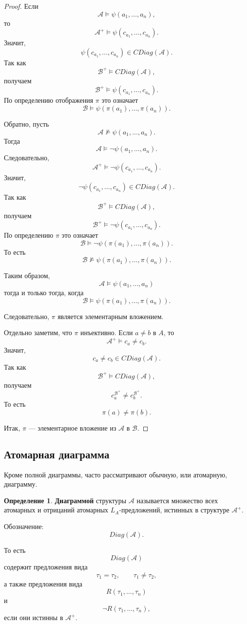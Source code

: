 \documentclass[12pt,a4paper,oneside,openany]{book}
\theoremstyle{definition}
\newtheorem{definition}{Определение}[chapter]
\theoremstyle{plain}
\theoremstyle{remark}
\begin{document}
\begin{proof}
Если
\[
\mathcal A\models\psi(a_1,\ldots,a_n),
\]
то
\[
\mathcal A^+\models\psi(c_{a_1},\ldots,c_{a_n}).
\]
Значит,
\[
\psi(c_{a_1},\ldots,c_{a_n})\in CDiag(\mathcal A).
\]
Так как
\[
\mathcal B^+\models CDiag(\mathcal A),
\]
получаем
\[
\mathcal B^+\models\psi(c_{a_1},\ldots,c_{a_n}).
\]
По определению отображения $\pi$ это означает
\[
\mathcal B\models\psi(\pi(a_1),\ldots,\pi(a_n)).
\]

Обратно, пусть
\[
\mathcal A\not\models\psi(a_1,\ldots,a_n).
\]
Тогда
\[
\mathcal A\models\neg\psi(a_1,\ldots,a_n).
\]
Следовательно,
\[
\mathcal A^+\models\neg\psi(c_{a_1},\ldots,c_{a_n}).
\]
Значит,
\[
\neg\psi(c_{a_1},\ldots,c_{a_n})\in CDiag(\mathcal A).
\]
Так как
\[
\mathcal B^+\models CDiag(\mathcal A),
\]
получаем
\[
\mathcal B^+\models\neg\psi(c_{a_1},\ldots,c_{a_n}).
\]
По определению $\pi$ это означает
\[
\mathcal B\models\neg\psi(\pi(a_1),\ldots,\pi(a_n)).
\]
То есть
\[
\mathcal B\not\models\psi(\pi(a_1),\ldots,\pi(a_n)).
\]

Таким образом,
\[
\mathcal A\models\psi(a_1,\ldots,a_n)
\]
тогда и только тогда, когда
\[
\mathcal B\models\psi(\pi(a_1),\ldots,\pi(a_n)).
\]

Следовательно, $\pi$ является элементарным вложением.

Отдельно заметим, что $\pi$ инъективно. Если $a\ne b$ в $A$, то
\[
\mathcal A^+\models c_a\ne c_b.
\]
Значит,
\[
c_a\ne c_b\in CDiag(\mathcal A).
\]
Так как
\[
\mathcal B^+\models CDiag(\mathcal A),
\]
получаем
\[
c_a^{\mathcal B^+}\ne c_b^{\mathcal B^+}.
\]
То есть
\[
\pi(a)\ne\pi(b).
\]

Итак, $\pi$ — элементарное вложение из $\mathcal A$ в $\mathcal B$.
\end{proof}

\subsection{Атомарная диаграмма}

Кроме полной диаграммы, часто рассматривают обычную, или атомарную, диаграмму.

\begin{definition}
\textbf{Диаграммой} структуры $\mathcal A$ называется множество всех атомарных и отрицаний атомарных $L_A$-предложений, истинных в структуре $\mathcal A^+$.

Обозначение:
\[
Diag(\mathcal A).
\]
\end{definition}

То есть
\[
Diag(\mathcal A)
\]
содержит предложения вида
\[
\tau_1=\tau_2,
\qquad
\tau_1\ne\tau_2,
\]
а также предложения вида
\[
R(\tau_1,\ldots,\tau_n)
\]
и
\[
\neg R(\tau_1,\ldots,\tau_n),
\]
если они истинны в $\mathcal A^+$.
\end{document}
